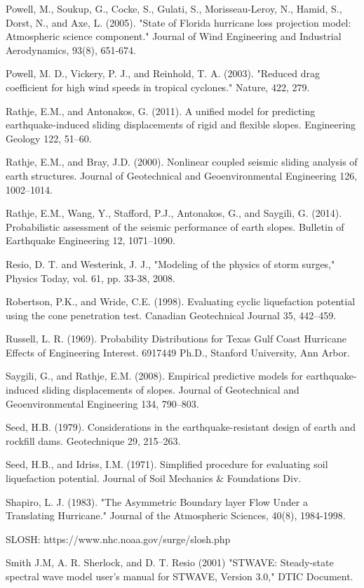 Powell, M., Soukup, G., Cocke, S., Gulati, S., Morisseau-Leroy, N., Hamid, S., Dorst, N., and Axe, L. (2005). "State of Florida hurricane loss projection model: Atmospheric science component." Journal of Wind Engineering and Industrial Aerodynamics, 93(8), 651-674.

Powell, M. D., Vickery, P. J., and Reinhold, T. A. (2003). "Reduced drag coefficient for high wind speeds in tropical cyclones." Nature, 422, 279.

Rathje, E.M., and Antonakos, G. (2011). A unified model for predicting earthquake-induced sliding displacements of rigid and flexible slopes. Engineering Geology 122, 51–60.

Rathje, E.M., and Bray, J.D. (2000). Nonlinear coupled seismic sliding analysis of earth structures. Journal of Geotechnical and Geoenvironmental Engineering 126, 1002–1014.

Rathje, E.M., Wang, Y., Stafford, P.J., Antonakos, G., and Saygili, G. (2014). Probabilistic assessment of the seismic performance of earth slopes. Bulletin of Earthquake Engineering 12, 1071–1090.

Resio, D. T. and Westerink, J. J., "Modeling of the physics of storm surges," Physics Today, vol. 61, pp. 33-38, 2008.

Robertson, P.K., and Wride, C.E. (1998). Evaluating cyclic liquefaction potential using the cone penetration test. Canadian Geotechnical Journal 35, 442–459.

Russell, L. R. (1969). Probability Distributions for Texas Gulf Coast Hurricane Effects of Engineering Interest. 6917449 Ph.D., Stanford University, Ann Arbor.

Saygili, G., and Rathje, E.M. (2008). Empirical predictive models for earthquake-induced sliding displacements of slopes. Journal of Geotechnical and Geoenvironmental Engineering 134, 790–803.

Seed, H.B. (1979). Considerations in the earthquake-resistant design of earth and rockfill dams. Geotechnique 29, 215–263.

Seed, H.B., and Idriss, I.M. (1971). Simplified procedure for evaluating soil liquefaction potential. Journal of Soil Mechanics & Foundations Div.

Shapiro, L. J. (1983). "The Asymmetric Boundary layer Flow Under a Translating Hurricane." Journal of the Atmospheric Sciences, 40(8), 1984-1998.

SLOSH: https://www.nhc.noaa.gov/surge/slosh.php

Smith J.M, A. R. Sherlock, and D. T. Resio (2001) "STWAVE: Steady-state spectral wave model user's manual for STWAVE, Version 3.0," DTIC Document.

